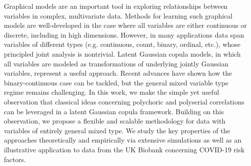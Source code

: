 
\noindent Graphical models are an important tool in exploring relationships between variables in complex, multivariate data. Methods for learning such graphical models are well-developed in the case where all variables are either continuous or discrete, including in high dimensions. However, in many applications data span variables of different types (e.g. continuous, count, binary, ordinal, etc.), whose principled joint analysis is nontrivial. Latent Gaussian copula models, in which all variables are modeled as transformations of underlying jointly Gaussian variables, represent a useful approach. Recent advances have shown how the binary-continuous case can be tackled, but the general mixed variable type regime remains challenging. In this work, we make the simple yet useful observation that classical ideas concerning polychoric and polyserial correlations can be leveraged in a latent Gaussian copula framework. Building on this observation, we propose a flexible and scalable methodology for data with variables of entirely general mixed type. We study the key properties of the approaches theoretically and empirically via extensive simulations as well as an illustrative application to data from the UK Biobank concerning COVID-19 risk factors.